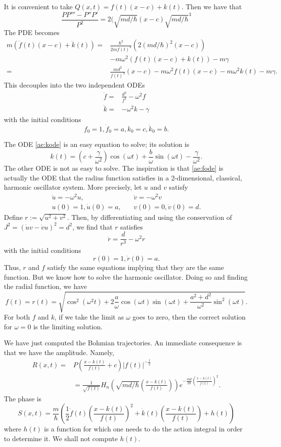 \documentclass[11pt]{article}
\theoremstyle{remark}
\begin{document}
It is convenient to take $Q(x,t) = f(t) (x-c) + k(t)$. Then we have
that 
\[ 
\frac{PP''' -P''P'}{P^2} =2(\sqrt{md/\hbar}
(x-c)\sqrt{md/\hbar}^3 
\] 
The PDE becomes
\[
\begin{split}
m(\ddot{f}(t) (x-c)  + \ddot{k}(t)) =& \frac{\ensuremath{\hbar}^2}{2m f(t)^3}
(2(md/\ensuremath{\hbar})^2(x-c)) 
\\& - m\omega^2 (f(t) (x-c)  + k(t)) - m\gamma 
\\
= & \frac{m d^2}{f(t)^3} (x-c)-  
m\omega^2 f(t) (x-c) - m \omega^2 k(t) -m\gamma.  
\end{split}
\]
This decouples into the two independent ODEs
\begin{align}
\ddot{f} =& \frac{d^2}{f^3} - \omega^2 f \label{ae:fode} \\
\ddot{k} =& -\omega^2 k - \gamma \label{ae:kode}
\end{align}
with the initial conditions
\[
f_0 = 1, \dot{f}_0  = a , k_0 = c, \dot{k}_0 = b . 
\]

The ODE \eqref{ae:kode} is an easy equation to solve; its solution is 
\[
k(t) = (c + \frac{\gamma}{\omega^2})\cos(\omega t) +
\frac{b}{\omega} \sin(\omega t) - 
\frac{\gamma}{\omega^2} .
\]
The other ODE is not as easy to solve. The inspiration is
that \eqref{ae:fode} is actually the ODE that the radius function
satisfies in a 2-dimensional, classical, harmonic oscillator
system. More precisely, let $u$ and $v$ satisfy 
\begin{align*} 
\ddot{u} = - \omega^2 u,\quad & \ddot{v} = -\omega^2v \\
u(0) = 1, \dot{u}(0) = a ,\quad& v(0) = 0, \dot{v}(0) = d.
\end{align*}
Define $r \ensuremath{:=} \sqrt{u^2 +v^2}$. Then, by differentiating and using
the conservation of $J^2 = (\dot{u}v -\dot{v}u)^2 = d^2$, 
we find that $r$
satisfies 
\[
\ddot{r} = \frac{d}{r^3} - \omega^2 r 
\]
with the initial conditions
\[
r(0) = 1, \dot{r}(0) =  a.
\]
Thus, $r$ and $f$ satisfy the same equations implying that they are
the same function. But we know how to
solve the harmonic oscillator. Doing so and finding the radial
function, we have
\[
f(t) = r(t) = \sqrt{\cos^2 (\omega^2 t) + 2 \frac{a}{\omega} \cos(\omega
t) \sin (\omega t) + \frac{a^2 + d^2}{\omega^2} \sin^2 (\omega t)}.
\]
For both $f$ and $k$, if we take the limit as $\omega$ goes to zero,
then the correct solution for $\omega =0$ is the limiting solution. 
 

We have just computed the Bohmian trajectories. An immediate
consequence is that we have the
amplitude. Namely, 
\[
\begin{split}
R(x,t) =& P( \frac{x -k(t)}{f(t)} + c)\ensuremath{\lvert {f(t)} \rvert}^{-\frac{1}{2}}
\\ &
= \frac{1}{\sqrt{f(t)}}
H_n(\sqrt{md/\ensuremath{\hbar}}(\frac{x -k(t)}{f(t)})) e^{-\frac{md}{2\ensuremath{\hbar}}
(\frac{x -k(t)}{f(t)})^2}.
\end{split}
\] 
The phase is 
\[
S(x,t) = \frac{m}{\ensuremath{\hbar}} (\frac{1}{2} \dot{f}(t) (\frac{x -k(t)}{f(t)})^2 +
\dot{k}(t) (\frac{x-k(t)}{f(t)}) +h(t)) 
\]
where $h(t)$ is a function for which one needs to do the action
integral in order to determine it. We shall not compute $h(t)$.

\clearpage


\end{document}
